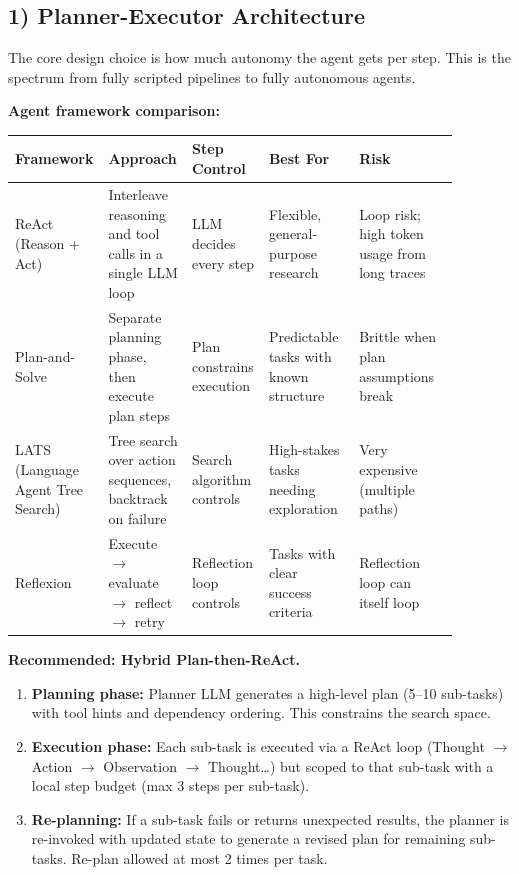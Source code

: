 \subsection*{1) Planner-Executor Architecture}

The core design choice is how much autonomy the agent gets per step. This is the spectrum from fully scripted pipelines to fully autonomous agents.

\textbf{Agent framework comparison:}

\begin{tabular}{|p{0.13\linewidth}|p{0.18\linewidth}|p{0.15\linewidth}|p{0.20\linewidth}|p{0.22\linewidth}|}
\hline
\textbf{Framework} & \textbf{Approach} & \textbf{Step Control} & \textbf{Best For} & \textbf{Risk} \\
\hline
ReAct (Reason + Act) & Interleave reasoning and tool calls in a single LLM loop & LLM decides every step & Flexible, general-purpose research & Loop risk; high token usage from long traces \\
\hline
Plan-and-Solve & Separate planning phase, then execute plan steps & Plan constrains execution & Predictable tasks with known structure & Brittle when plan assumptions break \\
\hline
LATS (Language Agent Tree Search) & Tree search over action sequences, backtrack on failure & Search algorithm controls & High-stakes tasks needing exploration & Very expensive (multiple paths) \\
\hline
Reflexion & Execute $\rightarrow$ evaluate $\rightarrow$ reflect $\rightarrow$ retry & Reflection loop controls & Tasks with clear success criteria & Reflection loop can itself loop \\
\hline
\end{tabular}

\textbf{Recommended: Hybrid Plan-then-ReAct.}

\begin{enumerate}
  \item \textbf{Planning phase:} Planner LLM generates a high-level plan (5--10 sub-tasks) with tool hints and dependency ordering. This constrains the search space.
  \item \textbf{Execution phase:} Each sub-task is executed via a ReAct loop (Thought $\rightarrow$ Action $\rightarrow$ Observation $\rightarrow$ Thought\ldots) but scoped to that sub-task with a local step budget (max 3 steps per sub-task).
  \item \textbf{Re-planning:} If a sub-task fails or returns unexpected results, the planner is re-invoked with updated state to generate a revised plan for remaining sub-tasks. Re-plan allowed at most 2 times per task.
\end{enumerate}

